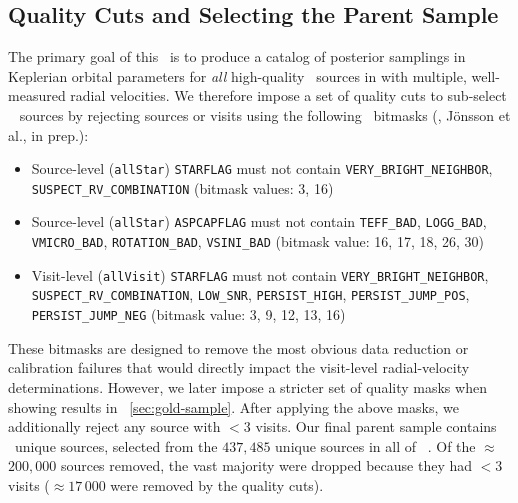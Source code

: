 \subsection{Quality Cuts and Selecting the Parent Sample}

The primary goal of this \documentname\ is to produce a catalog of posterior
samplings in Keplerian orbital parameters for \emph{all} high-quality \apogee\
sources in  with multiple, well-measured radial velocities.
We therefore impose a set of quality cuts to sub-select \apogee\  sources
by rejecting sources or visits using the following \apogee\
bitmasks (\citealt{Holtzman:2018}, J\"onsson et al., in prep.):
\begin{itemize}
    \item Source-level (\texttt{allStar}) \texttt{STARFLAG} must not contain
    \texttt{VERY\_BRIGHT\_NEIGHBOR}, \texttt{SUSPECT\_RV\_COMBINATION} (bitmask
    values: 3, 16)
    \item Source-level (\texttt{allStar}) \texttt{ASPCAPFLAG} must not contain
    \texttt{TEFF\_BAD}, \texttt{LOGG\_BAD}, \texttt{VMICRO\_BAD},
    \texttt{ROTATION\_BAD}, \texttt{VSINI\_BAD} (bitmask value: 16, 17, 18, 26,
    30)
    \item Visit-level (\texttt{allVisit}) \texttt{STARFLAG} must not contain
    \texttt{VERY\_BRIGHT\_NEIGHBOR}, \texttt{SUSPECT\_RV\_COMBINATION},
    \texttt{LOW\_SNR}, \texttt{PERSIST\_HIGH}, \texttt{PERSIST\_JUMP\_POS},
    \texttt{PERSIST\_JUMP\_NEG} (bitmask value: 3, 9, 12, 13, 16)
\end{itemize}
These bitmasks are designed to remove the most obvious data reduction or
calibration failures that would directly impact the visit-level radial-velocity
determinations.
However, we later impose a stricter set of quality masks when showing results in
\sectionname~\ref{sec:gold-sample}.
After applying the above masks, we additionally reject any source with $<3$
visits.
Our final parent sample contains \nsources\ unique sources, selected from the
$437,485$ unique sources in all of \apogee\ .
Of the $\approx$$200,000$ sources removed, the vast majority were dropped
because they had $<3$ visits ($\approx$$17\,000$ were removed by the quality
cuts).



